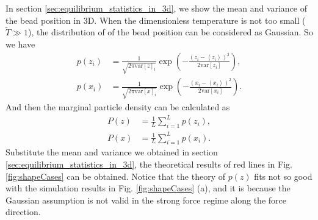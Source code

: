 In section \ref{sec:equilibrium_statistics_in_3d}, we show the mean and variance of the bead position in 3D. When the dimensionless temperature is not too small ($\tilde{T}\gg 1$), the distribution of of the bead position can be considered as Gaussian. So we have
\begin{subequations}
    \label{eq:posDistribution}
    \begin{align}
    p(z_i) & = \frac{1}{\sqrt{2\pi \text{var}\left[z\right]_i}} \exp\left(-\frac{(z_i - \left<z_i\right>)^2}{2\text{var}\left[z_i\right]}\right), \\
    p(x_i) & = \frac{1}{\sqrt{2\pi \text{var}\left[x\right]_i}} \exp\left(-\frac{(x_i - \left<x_i\right>)^2}{2\text{var}\left[x_i\right]}\right).
    \end{align}
\end{subequations}
And then the marginal particle density can be calculated as
\begin{subequations}
    \label{eq:particleDensity}
    \begin{align}
        P(z) & = \frac{1}{L} \sum_{i=1}^L p(z_i), \\
        P(x) & = \frac{1}{L} \sum_{i=1}^L p(x_i).
    \end{align}
\end{subequations}
Substitute the mean and variance we obtained in section \ref{sec:equilibrium_statistics_in_3d}, the theoretical results of red lines in Fig. \ref{fig:shapeCases} can be obtained. Notice that the theory of $p(z)$ fits not so good with the simulation results in Fig. \ref{fig:shapeCases} (a), and it is because the Gaussian assumption is not valid in the strong force regime along the force direction. 

